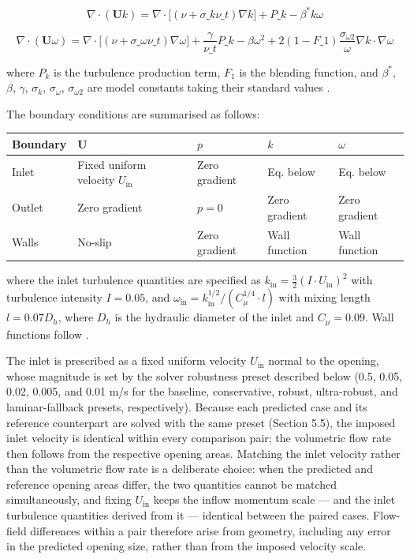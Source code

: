 \documentclass[preprint,12pt,number]{elsarticle}
\begin{document}
\begin{equation}
\nabla \cdot (\mathbf{U} k) = \nabla \cdot \bigl[(\nu + \sigma\_k \nu\_t) \nabla k\bigr] + P\_k - \beta^* k \omega
\label{eq:k-transport}
\end{equation}

\begin{equation}
\nabla \cdot (\mathbf{U} \omega) = \nabla \cdot \bigl[(\nu + \sigma\_\omega \nu\_t) \nabla \omega\bigr] + \frac{\gamma}{\nu\_t} P\_k - \beta \omega^2 + 2(1 - F\_1) \frac{\sigma_{\omega 2}}{\omega} \nabla k \cdot \nabla \omega
\label{eq:omega-transport}
\end{equation}

where $P_k$ is the turbulence production term, $F_1$ is the blending function, and $\beta^*$, $\beta$, $\gamma$, $\sigma_k$, $\sigma_\omega$, $\sigma_{\omega 2}$ are model constants taking their standard values \cite{menter1994TwoequationEddyviscosity}.

The boundary conditions are summarised as follows:

\begin{tabular}{lllll}
\toprule
Boundary & $\mathbf{U}$ & $p$ & $k$ & $\omega$ \\
\midrule
Inlet & Fixed uniform velocity $U_\text{in}$ & Zero gradient & Eq. below & Eq. below \\
Outlet & Zero gradient & $p = 0$ & Zero gradient & Zero gradient \\
Walls & No-slip & Zero gradient & Wall function & Wall function \\
\bottomrule
\end{tabular}


where the inlet turbulence quantities are specified as $k_\text{in} = \frac{3}{2}(I \cdot U_\text{in})^2$ with turbulence intensity $I = 0.05$, and $\omega_\text{in} = k_\text{in}^{1/2} / (C_\mu^{1/4} \cdot l)$ with mixing length $l = 0.07 D_h$, where $D_h$ is the hydraulic diameter of the inlet and $C_\mu = 0.09$. Wall functions follow \cite{launder.spalding1974NumericalComputation}.

The inlet is prescribed as a fixed uniform velocity $U_\text{in}$ normal to the opening, whose magnitude is set by the solver robustness preset described below (0.5, 0.05, 0.02, 0.005, and 0.01 m/s for the baseline, conservative, robust, ultra-robust, and laminar-fallback presets, respectively). Because each predicted case and its reference counterpart are solved with the same preset (Section 5.5), the imposed inlet velocity is identical within every comparison pair; the volumetric flow rate then follows from the respective opening areas. Matching the inlet velocity rather than the volumetric flow rate is a deliberate choice: when the predicted and reference opening areas differ, the two quantities cannot be matched simultaneously, and fixing $U_\text{in}$ keeps the inflow momentum scale --- and the inlet turbulence quantities derived from it --- identical between the paired cases. Flow-field differences within a pair therefore arise from geometry, including any error in the predicted opening size, rather than from the imposed velocity scale.
\end{document}
